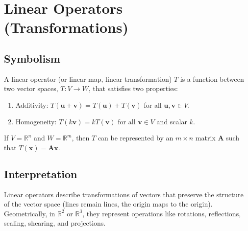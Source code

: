 \documentclass{article}
\newcommand{\vect}[1]{\bm{#1}} %
\newcommand{\mat}[1]{\bm{#1}}  %
\newcommand{\R}{\mathbb{R}}    %
\begin{document}
\section{Linear Operators (Transformations)}

\subsection*{Symbolism}
A linear operator (or linear map, linear transformation) $T$ is a function between two vector spaces, $T: V \to W$, that satisfies two properties:
\begin{enumerate}
    \item Additivity: $T(\vect{u} + \vect{v}) = T(\vect{u}) + T(\vect{v})$ for all $\vect{u}, \vect{v} \in V$.
    \item Homogeneity: $T(k\vect{v}) = k T(\vect{v})$ for all $\vect{v} \in V$ and scalar $k$.
\end{enumerate}
If $V = \R^n$ and $W = \R^m$, then $T$ can be represented by an $m \times n$ matrix $\mat{A}$ such that $T(\vect{x}) = \mat{A}\vect{x}$.

\subsection*{Interpretation}
Linear operators describe transformations of vectors that preserve the structure of the vector space (lines remain lines, the origin maps to the origin). Geometrically, in $\R^2$ or $\R^3$, they represent operations like rotations, reflections, scaling, shearing, and projections.
\end{document}
